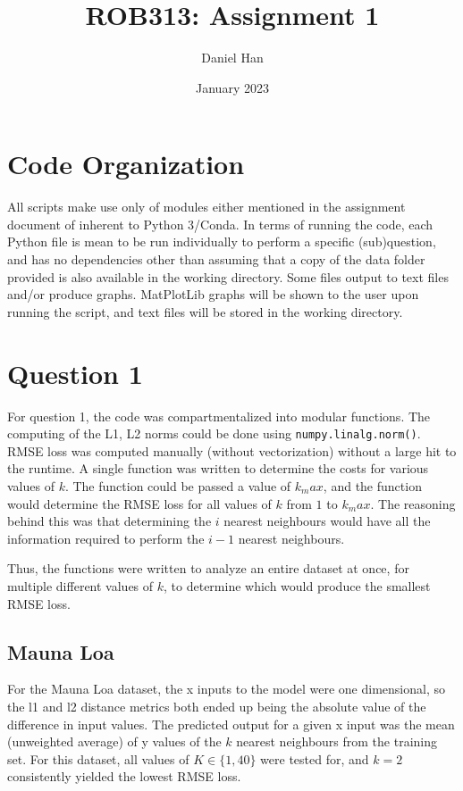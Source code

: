 \documentclass{article}
\title{ROB313: Assignment 1}
\author{Daniel Han}
\date{January 2023}
\begin{document}
\maketitle

\section*{Code Organization}
All scripts make use only of modules either mentioned in the assignment document of inherent to Python 3/Conda. In terms of running the code, each Python file is mean to be run individually to perform a specific (sub)question, and has no dependencies other than assuming that a copy of the data folder provided is also available in the working directory. Some files output to text files and/or produce graphs. MatPlotLib graphs will be shown to the user upon running the script, and text files will be stored in the working directory.

\section{Question 1}
For question 1, the code was compartmentalized into modular functions. The computing of the L1, L2 norms could be done using \texttt{numpy.linalg.norm()}. RMSE loss was computed manually (without vectorization) without a large hit to the runtime. A single function was written to determine the costs for various values of $k$. The function could be passed a value of $k_max$, and the function would determine the RMSE loss for all values of $k$ from $1$ to $k_max$. The reasoning behind this was that determining the $i$ nearest neighbours would have all the information required to perform the $i-1$ nearest neighbours.

Thus, the functions were written to analyze an entire dataset at once, for multiple different values of $k$, to determine which would produce the smallest RMSE loss.

\subsection{Mauna Loa}

For the Mauna Loa dataset, the x inputs to the model were one dimensional, so the l1 and l2 distance metrics both ended up being the absolute value of the difference in input values. The predicted output for a given x input was the mean (unweighted average) of y values of the $k$ nearest neighbours from the training set. For this dataset, all values of $K \in \{1, 40\}$ were tested for, and $k=2$ consistently yielded the lowest RMSE loss.
\end{document}
